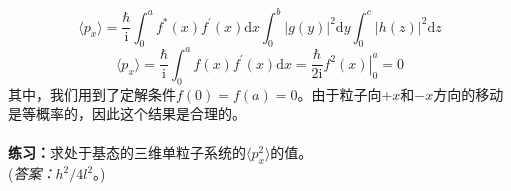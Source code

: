 \begin{examplebox}
\begin{equation*}
		\end{equation*}
		\begin{equation*}
			\langle p_x \rangle = \frac{\hbar}{\mathrm{i}}\int_{0}^{a}f^{\ast}\left(x\right)f^{\prime}\left(x\right)\mathrm{d}x \int_{0}^{b}\left|g\left(y\right)\right|^{2}\mathrm{d}y \int_{0}^{c}\left|h\left(z\right)\right|^{2}\mathrm{d}z
		\end{equation*}
		\begin{equation}
			\langle p_x \rangle = \frac{\hbar}{\mathrm{i}}\int_{0}^{a}f\left(x\right)f^{\prime}\left(x\right)\mathrm{d}x = \frac{\hbar}{2\mathrm{i}}\left. f^2\left(x\right) \right|_{0}^{a} = 0
			\label{eq:3.92}
		\end{equation}
		其中，我们用到了定解条件$f\left(0\right)=f\left(a\right)=0$。由于粒子向$+x$和$-x$方向的移动是等概率的，因此这个结果是合理的。\\
		\\
		\textbf{练习：}求处于基态的三维单粒子系统的$\langle p_x^2 \rangle$的值。\\
		(\textit{答案：}$h^2/4l^2$。)
	\end{examplebox}

